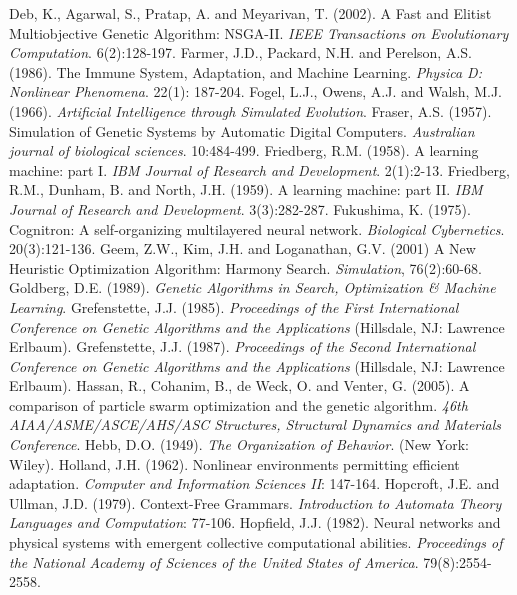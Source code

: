 \documentclass[spanish,a4paper,12pt,twoside]{report}
\begin{document}
\begin{thebibliography}{00}
   Deb, K., Agarwal, S., Pratap, A. and Meyarivan, T. (2002). A Fast and Elitist Multiobjective Genetic Algorithm: NSGA-II. \emph{IEEE Transactions on Evolutionary Computation}. 6(2):128-197.
   Farmer, J.D., Packard, N.H. and Perelson, A.S. (1986). The Immune System, Adaptation, and Machine Learning. \emph{Physica D: Nonlinear Phenomena}. 22(1): 187-204.
   Fogel, L.J., Owens, A.J. and Walsh, M.J. (1966). \emph{Artificial Intelligence through Simulated Evolution}.
   Fraser, A.S. (1957). Simulation of Genetic Systems by Automatic Digital Computers. \emph{Australian journal of biological sciences}. 10:484-499.
   Friedberg, R.M. (1958). A learning machine: part I. \emph{IBM Journal of Research and Development}. 2(1):2-13.
   Friedberg, R.M., Dunham, B. and North, J.H. (1959). A learning machine: part II. \emph{IBM Journal of Research and Development}. 3(3):282-287.
   Fukushima, K. (1975). Cognitron: A self-organizing multilayered neural network. \emph{Biological Cybernetics}. 20(3):121-136.
   Geem, Z.W., Kim, J.H. and Loganathan, G.V. (2001) A New Heuristic Optimization Algorithm: Harmony Search. \emph{Simulation}, 76(2):60-68.
   Goldberg, D.E. (1989). \emph{Genetic Algorithms in Search, Optimization \& Machine Learning}.
   Grefenstette, J.J. (1985). \emph{Proceedings of the First International Conference on Genetic Algorithms and the Applications} (Hillsdale, NJ: Lawrence Erlbaum).
   Grefenstette, J.J. (1987). \emph{Proceedings of the Second International Conference on Genetic Algorithms and the Applications} (Hillsdale, NJ: Lawrence Erlbaum).
   Hassan, R., Cohanim, B., de Weck, O. and Venter, G. (2005). A comparison of particle swarm optimization and the genetic algorithm. \emph{46th AIAA/ASME/ASCE/AHS/ASC Structures, Structural Dynamics and Materials Conference}.
   Hebb, D.O. (1949). \emph{The Organization of Behavior}. (New York: Wiley).
   Holland, J.H. (1962). Nonlinear environments permitting efficient adaptation. \emph{Computer and Information Sciences II}: 147-164.
   Hopcroft, J.E. and Ullman, J.D. (1979). Context-Free Grammars. \emph{Introduction to Automata Theory Languages and Computation}: 77-106.
   Hopfield, J.J. (1982). Neural networks and physical systems with emergent collective computational abilities. \emph{Proceedings of the National Academy of Sciences of the United States of America}. 79(8):2554-2558.

\end{thebibliography}
\end{document}
